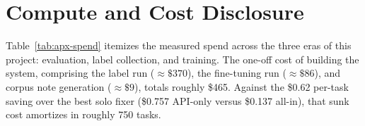 \section{Compute and Cost Disclosure}
\label{apx:spend}

Table~\ref{tab:apx-spend} itemizes the measured spend across the three eras
of this project: evaluation, label collection, and training.
The one-off cost of building the system, comprising the label run
(${\approx}\$370$), the fine-tuning run (${\approx}\$86$), and corpus
note generation (${\approx}\$9$), totals roughly \$465.  Against the
\$0.62 per-task saving over the best solo fixer (\$0.757 API-only
versus \$0.137 all-in), that sunk cost amortizes in roughly 750 tasks.

\begin{table}[H]
\centering
\footnotesize
\caption{\textbf{Measured spend.}
Every figure is a measured value from the run ledgers.  The evaluation
era covers all five arms plus infrastructure; the label-run era covers
fresh per-task outcomes; the training era is the single SFT run.
\modelname's entire evaluation contribution was \$1.13 of GPU time
(${\sim}0.4$ cents per task).  Era totals are not summed.}
\label{tab:apx-spend}

\end{table}


